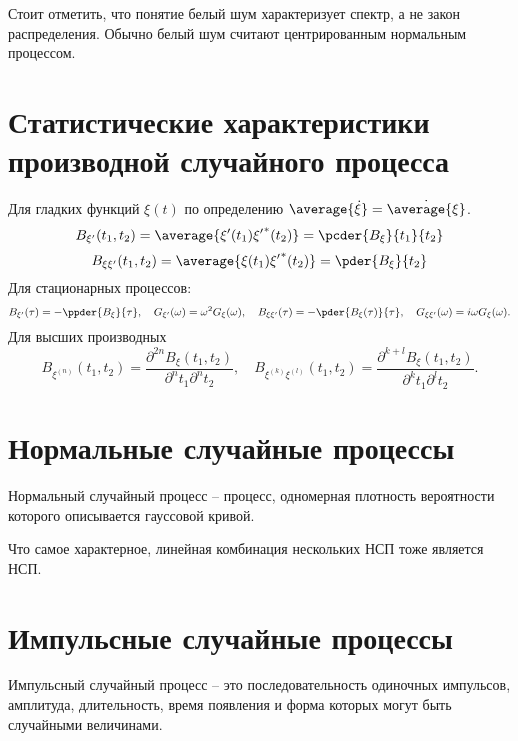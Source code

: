Стоит отметить, что понятие белый шум характеризует спектр, а не закон
распределения. Обычно белый шум считают центрированным нормальным процессом.

\section{Статистические характеристики производной случайного процесса}
Для гладких функций \( \xi(t) \) по определению
\( \average{\dot{\xi}} = \dot{\average{\xi}} \).
\[
    B_{\xi'}(t_1, t_2) = \average{\xi'(t_1){\xi'}^*(t_2)} =
        \pcder{B_\xi}{t_1}{t_2}
\]
\[
    B_{\xi\xi'}(t_1, t_2) = \average{\xi(t_1){\xi'}^*(t_2)} =
        \pder{B_\xi}{t_2}
\]
Для стационарных процессов:
\[
    B_{\xi'}(\tau) = -\ppder{B_\xi}{\tau},\quad
    G_{\xi'}(\omega) = \omega^2 G_\xi(\omega),\quad
    B_{\xi\xi'}(\tau) = -\pder{B_\xi(\tau)}{\tau},\quad
    G_{\xi\xi'}(\omega) = i\omega G_\xi(\omega).
\]
Для высших производных
\[
    B_{\xi^{(n)}}(t_1, t_2) =
        \frac{\partial^{2n} B_\xi(t_1, t_2)}{\partial^n t_1 \partial^n t_2},
        \quad
    B_{\xi^{(k)}\xi^{(l)}}(t_1, t_2) =
        \frac{\partial^{k+l} B_\xi(t_1, t_2)}{\partial^k t_1 \partial^l t_2}.
\]

\section{Нормальные случайные процессы}
Нормальный случайный процесс -- процесс, одномерная плотность вероятности
которого описывается гауссовой кривой.

Что самое характерное, линейная комбинация нескольких НСП тоже является НСП.

\section{Импульсные случайные процессы}
Импульсный случайный процесс -- это последовательность одиночных импульсов,
амплитуда, длительность, время появления и форма которых могут быть случайными
величинами.
